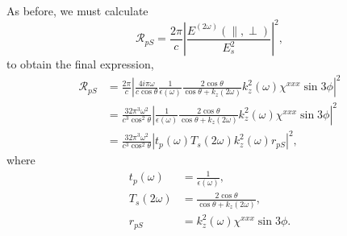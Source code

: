 \documentclass[10pt]{article}
\begin{document}
As before, we must calculate
\begin{equation*}
\mathcal{R}_{pS}
= \frac{2\pi}{c}
  \left\vert\frac{E^{(2\omega)}(\parallel,\perp)}{E^{2}_{s}}\right\vert^{2},
\end{equation*}
to obtain the final expression,
\begin{align}
\mathcal{R}_{pS}
&= \frac{2\pi}{c}
   \left\vert
   \frac{4i\pi\omega}{c\cos\theta}
   \frac{1}{\epsilon(\omega)}
   \frac{2\cos\theta}{\cos\theta + k_{z}(2\omega)}
   k^{2}_{z}(\omega)\chi^{xxx}\sin3\phi
   \right\vert^{2}\nonumber\\
&= \frac{32\pi^{3}\omega^{2}}{c^{3}\cos^{2}\theta}
   \left\vert
   \frac{1}{\epsilon(\omega)}
   \frac{2\cos\theta}{\cos\theta + k_{z}(2\omega)}
   k^{2}_{z}(\omega)\chi^{xxx}\sin3\phi
   \right\vert^{2}\nonumber\\
&= \frac{32\pi^{3}\omega^{2}}{c^{3}\cos^{2}\theta}
  \left\vert t_{p}(\omega)T_{s}(2\omega)k^{2}_{z}(\omega)r_{pS}\right\vert^{2},
  \label{RpS}
\end{align}
where
\begin{equation*}
\begin{split}
t_{p}(\omega)
&= \frac{1}{\epsilon(\omega)},\\
T_{s}(2\omega)
&= \frac{2\cos\theta}{\cos\theta + k_{z}(2\omega)},\\
r_{pS} &= k^{2}_{z}(\omega)\chi^{xxx}\sin3\phi.
\end{split}
\end{equation*}
\end{document}
